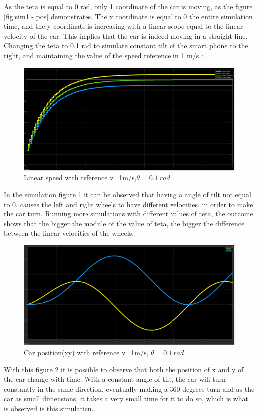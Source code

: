 As the teta is equal to 0 rad, only 1 coordinate of the car is moving, as the figure \ref{fig:sim1 - pos} demonstrates. The x coordinate is equal to 0 the entire simulation time, and the y coordinate is increasing with a linear scope equal to the linear velocity of the car. This implies that the car is indeed moving in a straight line.\\
\newpage
Changing the teta to 0.1 rad to simulate constant tilt of the smart phone to the right, and maintaining the value of the speed reference in 1 m/s :\
\begin{figure}[!h]
\centering
\includegraphics[width=1.0\textwidth]{./img/vel101.png}
\caption {\label{fig:sim2 - vel}Linear speed with reference v=1m/s,$\theta = 0.1~\si{rad}$}
\end{figure}
In the simulation figure \ref{fig:sim2 - vel} it can be observed that having a angle of tilt not equal to 0, causes the left and right wheels to have different velocities, in order to make the car turn. Running more simulations with different values of teta, the outcome shows that the bigger the module of the value of teta, the bigger the difference between the linear velocities of the wheels.
\begin{figure}[!ht]
\centering
\includegraphics[width=1.0\textwidth]{./img/xy101.png}
\caption {\label{fig:sim2 - pos}Car position(xy) with reference v=1m/s, $\theta = 0.1~\si{rad}$}
\end{figure}
With this figure \ref{fig:sim2 - pos} it is possible to observe that both the
position of x and y of the car change with time. With a constant angle of tilt,
the car will turn constantly in the same direction, eventually making a 360
degrees turn and as the car as small dimensions, it takes a very small time for
it to do so, which is what is observed is this simulation.
